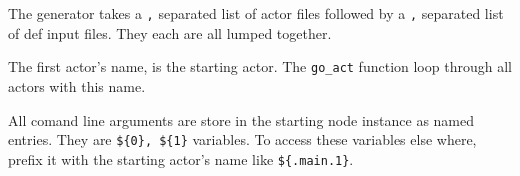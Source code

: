 The generator takes a \texttt{,} separated list of actor files followed
by a \texttt{,} separated list of def input files. They each are all
lumped together.

The first actor's name, is the starting actor. The \texttt{go\_act}
function loop through all actors with this name.

All comand line arguments are store in the starting node instance as
named entries. They are \texttt{\$\{0\},\ \$\{1\}} variables. To access
these variables else where, prefix it with the starting actor's name
like \texttt{\$\{.main.1\}}.
